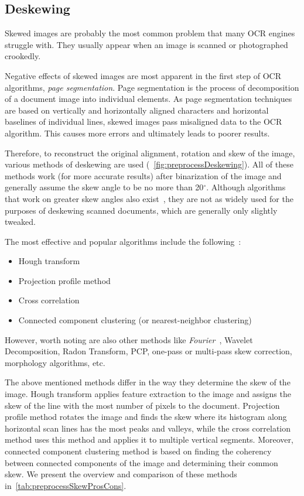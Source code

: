 \subsection{Deskewing}

Skewed images are probably the most common problem that many OCR engines struggle with. They usually appear when an image is scanned or photographed crookedly.

Negative effects of skewed images are most apparent in the first step of OCR algorithms, \emph{page segmentation}. Page segmentation is the process of decomposition of a document image into individual elements. As page segmentation techniques are based on vertically and horizontally aligned characters and horizontal baselines of individual lines, skewed images pass misaligned data to the OCR algorithm. This causes more errors and ultimately leads to poorer results.

Therefore, to reconstruct the original alignment, rotation and skew of the image, various methods of deskewing are used (~\cref{fig:preprocessDeskewing}). All of these methods work (for more accurate results) after binarization of the image and generally assume the skew angle to be no more than 20$^{\circ}$. Although algorithms that work on greater skew angles also exist~\citep{skewAngleDetection}, they are not as widely used for the purposes of deskewing scanned documents, which are generally only slightly tweaked.

The most effective and popular algorithms include the following~\citep{skewBestTechniques}:
\begin{itemize}
    \item Hough transform
    \item Projection profile method
    \item Cross correlation
    \item Connected component clustering (or nearest-neighbor clustering)
\end{itemize}
However, worth noting are also other methods like \emph{Fourier}~\citep{fourierTransform}, Wavelet Decomposition, Radon Transform, PCP, one-pass or multi-pass skew correction, morphology algorithms, etc.

The above mentioned methods differ in the way they determine the skew of the image. Hough transform applies feature extraction to the image and assigns the skew of the line with the most number of pixels to the document. Projection profile method rotates the image and finds the skew where its histogram along horizontal scan lines has the most peaks and valleys, while the cross correlation method uses this method and applies it to multiple vertical segments. Moreover, connected component clustering method is based on finding the coherency between connected components of the image and determining their common skew. We present the overview and comparison of these methods in~\cref{tab:preprocessSkewProsCons}.

